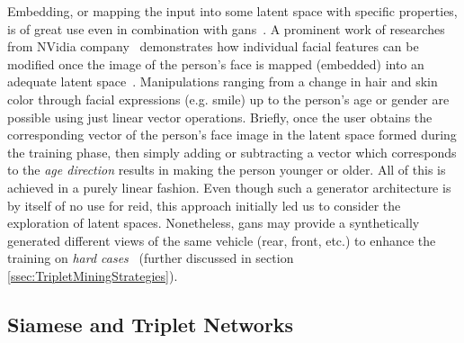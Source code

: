 Embedding, or mapping the input into some latent space with specific properties, is of great use even in combination with \glspl{gan}~\cite{Goodfellow2014}. A prominent work of researches from NVidia company~\cite{nvidia} demonstrates how individual facial features can be modified once the image of the person's face is mapped (embedded) into an adequate latent space~\cite{Karras2020}. Manipulations ranging from a change in hair and skin color through facial expressions (e.g. smile) up to the person's age or gender are possible using just linear vector operations. Briefly, once the user obtains the corresponding vector of the person's face image in the latent space formed during the training phase, then simply adding or subtracting a vector which corresponds to the \emph{age direction} results in making the person younger or older. All of this is achieved in a purely linear fashion. Even though such a generator architecture is by itself of no use for \gls{reid}, this approach initially led us to consider the exploration of latent spaces. Nonetheless, \glspl{gan} may provide a synthetically generated different views of the same vehicle (rear, front, etc.) to enhance the training on \emph{hard cases}~\cite{Lou2019} (further discussed in section \ref{ssec:TripletMiningStrategies}).

\subsection{Siamese and Triplet Networks}
\label{ssec:SiameseAndTripletNetworks}

